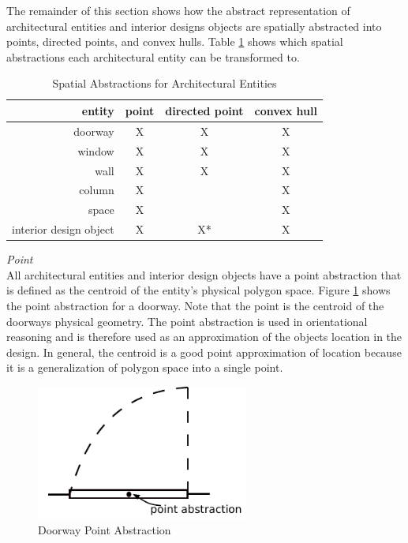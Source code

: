 \documentclass[12pt]{ucthesis}
\begin{document}
The remainder of this section shows how the abstract representation of architectural entities and interior designs objects are spatially abstracted into points, directed points, and convex hulls. Table \ref{spatial abstractions} shows which spatial abstractions each architectural entity can be transformed to. 

\begin{table}[H]
  \begin{center}
  \begin{tabular}{ | r | c | c | c |}
    \hline
    entity & point & directed point & convex hull\\ \hline
    doorway & X & X & X \\ \hline
    window & X & X & X \\ \hline
    wall & X & X & X \\ \hline
    column & X &  & X \\ \hline
    space & X &  & X \\ \hline
    interior design object & X & X* & X \\
    \hline
  \end{tabular}
  \end{center}
\caption{Spatial Abstractions for Architectural Entities}
\label{spatial abstractions}
\end{table} 

\noindent \emph{\large Point} \\
\indent All architectural entities and interior design objects have a point abstraction that is defined as the centroid of the entity's physical polygon space. Figure \ref{point-abs} shows the point abstraction for a doorway. Note that the point is the centroid of the doorways physical geometry. The point abstraction is used in orientational reasoning and is therefore used as an approximation of the objects location in the design. In general, the centroid is a good point approximation of location because it is a generalization of polygon space into a single point. 

\begin{figure}[H]
\centering
\includegraphics[width=70mm]{point-abs}
\caption{Doorway Point Abstraction}
\label{point-abs}
\end{figure}
\end{document}
